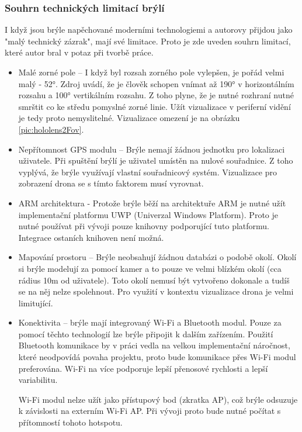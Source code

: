 \subsubsection{Souhrn technických limitací brýlí}
I když jsou brýle napěchované moderními technologiemi a autorovy přijdou jako "malý technický zázrak", mají své limitace. Proto je zde uveden souhrn limitací, které autor bral v potaz při tvorbě práce. 
\begin{itemize}
    \item Malé zorné pole -- I když byl rozsah zorného pole vylepšen, je pořád velmi malý - 52°.  Zdroj \cite{HumanEye} uvádí, že je člověk schopen vnímat až 190° v horizontálním rozsahu a 100° vertikálním rozsahu. Z toho plyne, že je nutné rozhraní nutné smrštit co ke středu pomyslné zorné linie. Užít vizualizace v periferní vidění je tedy proto nemyslitelné. Vizualizace omezení je na obrázku \ref{pic:hololens2Fov}.
    \item Nepřítomnost GPS modulu -- Brýle nemají žádnou jednotku pro lokalizaci uživatele. Při spuštění brýlí je uživatel umístěn na nulové souřadnice. Z toho vyplývá, že brýle využívají vlastní souřadnicový systém. Vizualizace pro zobrazení drona se s tímto faktorem musí vyrovnat.
    \item ARM architektura - Protože brýle běží na architektuře ARM je nutné užít implementační platformu UWP (Univerzal Windows Platform). Proto je nutné používat při vývoji pouze knihovny podporující tuto platformu. Integrace ostaních knihoven není možná.
    \item Mapování prostoru -- Brýle neobsahují žádnou databázi o podobě okolí. Okolí si brýle modelují za pomocí kamer a to pouze ve velmi blízkém okolí (cca rádius 10m od uživatele). Toto okolí nemusí být vytvořeno dokonale a tudíš se na něj nelze spolehnout. Pro využití v kontextu vizualizace drona je velmi limitující.
    \item Konektivita -- brýle mají integrovaný Wi-Fi a Bluetooth modul. Pouze za pomocí těchto technologií lze brýle připojit k dalším zařízením. Použití Bluetooth komunikace by v práci vedla na velkou implementační náročnost, které neodpovídá povaha projektu, proto bude komunikace přes Wi-Fi modul preferována. Wi-Fi na více podporuje lepší přenosové rychlosti a lepší variabilitu. 
    
    Wi-Fi modul nelze užít jako přístupový bod (zkratka AP), což brýle odsuzuje k závislosti na externím Wi-Fi AP. Při vývoji proto bude nutné počítat s přítomností tohoto hotspotu. 
\end{itemize}
